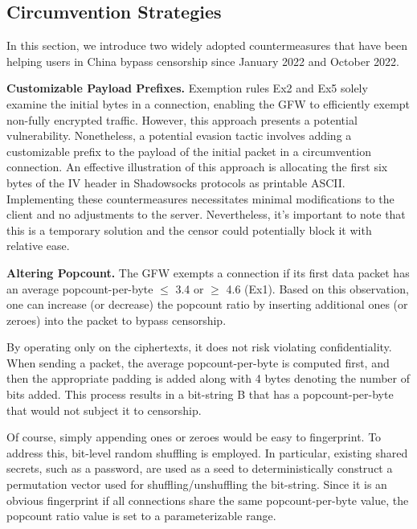 \subsection{Circumvention Strategies}
In this section, we introduce two widely adopted countermeasures that have been helping users in China bypass censorship since January 2022 and October 2022.

\textbf{Customizable Payload Prefixes.} Exemption rules Ex2 and Ex5 solely examine the initial bytes in a connection, enabling the GFW to efficiently exempt non-fully encrypted traffic. However, this approach presents a potential vulnerability. Nonetheless, a potential evasion tactic involves adding a customizable prefix to the payload of the initial packet in a circumvention connection. An effective illustration of this approach is allocating the first six bytes of the IV header in Shadowsocks protocols as printable ASCII. Implementing these countermeasures necessitates minimal modifications to the client and no adjustments to the server. Nevertheless, it's important to note that this is a temporary solution and the censor could potentially block it with relative ease.

\textbf{Altering Popcount.} The GFW exempts a connection if its first data packet has an average popcount-per-byte ${\leq}$ 3.4 or ${\geq}$ 4.6 (Ex1). Based on this observation, one can increase (or decrease) the popcount ratio by inserting additional ones (or zeroes) into the packet to bypass censorship.

By operating only on the ciphertexts, it does not risk violating confidentiality. When sending a packet, the average popcount-per-byte is computed first, and then the appropriate padding is added along with 4 bytes denoting the number of bits added. This process results in a bit-string B that has a popcount-per-byte that would not subject it to censorship.

Of course, simply appending ones or zeroes would be easy to fingerprint. To address this, bit-level random shuffling is employed. In particular, existing shared secrets, such as a password, are used as a seed to deterministically construct a permutation vector used for shuffling/unshuffling the bit-string. Since it is an obvious fingerprint if all connections share the same popcount-per-byte value, the popcount ratio value is set to a parameterizable range.

